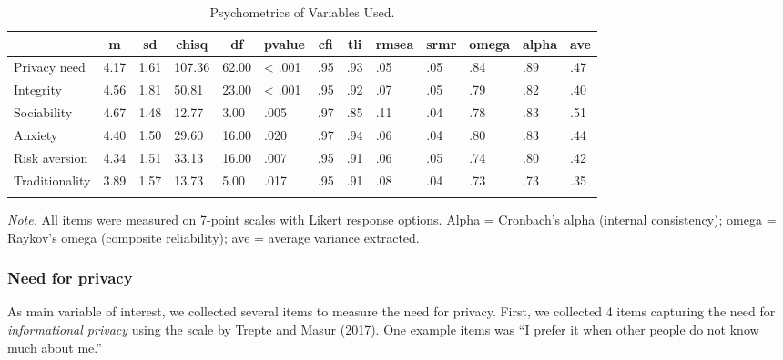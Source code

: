 \documentclass[man,floatsintext]{apa6}
\theoremstyle{definition}
\theoremstyle{definition}
\theoremstyle{definition}
\theoremstyle{remark}
\begin{document}
\begin{table}[tbp]
\begin{center}
\begin{threeparttable}
\caption{\label{tab:psychometrics}Psychometrics of Variables Used.}
\footnotesize{
\begin{tabular}{lllllllllllll}
\toprule
 & \multicolumn{1}{c}{m} & \multicolumn{1}{c}{sd} & \multicolumn{1}{c}{chisq} & \multicolumn{1}{c}{df} & \multicolumn{1}{c}{pvalue} & \multicolumn{1}{c}{cfi} & \multicolumn{1}{c}{tli} & \multicolumn{1}{c}{rmsea} & \multicolumn{1}{c}{srmr} & \multicolumn{1}{c}{omega} & \multicolumn{1}{c}{alpha} & \multicolumn{1}{c}{ave}\\
\midrule
Privacy need & 4.17 & 1.61 & 107.36 & 62.00 & < .001 & .95 & .93 & .05 & .05 & .84 & .89 & .47\\
Integrity & 4.56 & 1.81 & 50.81 & 23.00 & < .001 & .95 & .92 & .07 & .05 & .79 & .82 & .40\\
Sociability & 4.67 & 1.48 & 12.77 & 3.00 & .005 & .97 & .85 & .11 & .04 & .78 & .83 & .51\\
Anxiety & 4.40 & 1.50 & 29.60 & 16.00 & .020 & .97 & .94 & .06 & .04 & .80 & .83 & .44\\
Risk aversion & 4.34 & 1.51 & 33.13 & 16.00 & .007 & .95 & .91 & .06 & .05 & .74 & .80 & .42\\
Traditionality & 3.89 & 1.57 & 13.73 & 5.00 & .017 & .95 & .91 & .08 & .04 & .73 & .73 & .35\\
\bottomrule
\addlinespace
\end{tabular}
}
\begin{tablenotes}[para]
\normalsize{\textit{Note.} All items were measured on 7-point scales with Likert response options. Alpha = Cronbach's alpha (internal consistency); omega = Raykov's omega (composite reliability); ave = average variance extracted.}
\end{tablenotes}
\end{threeparttable}
\end{center}
\end{table}

\hypertarget{need-for-privacy}{%
\subsubsection{Need for privacy}\label{need-for-privacy}}

As main variable of interest, we collected several items to measure the
need for privacy. First, we collected 4 items capturing the need for
\emph{informational privacy} using the scale by Trepte and Masur (2017).
One example items was \enquote{I prefer it when other people do not know
much about me.}
\end{document}
